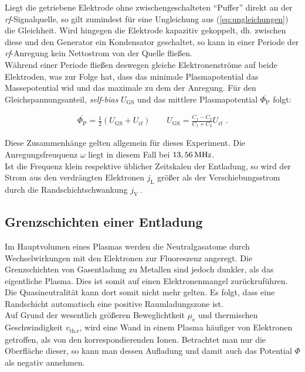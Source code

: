 \documentclass[numbers=noenddot,a4paper]{scrartcl}
\newcommand{\ix}[1]{_\text{#1}}
\newcommand{\tilt}[1]{\textit{#1}}
\begin{document}
			Liegt die getriebene Elektrode ohne zwischengeschalteten ``Puffer'' direkt an der \tilt{rf}-Signalquelle, so gilt zumindest f\"ur eine Ungleichung aus (\ref{eq:ungleichungen}) die Gleichheit. Wird hingegen die Elektrode kapazitiv gekoppelt, dh. zwischen diese und den Generator ein Kondensator geschaltet, so kann in einer Periode der \tilt{rf}-Anregung kein Nettostrom von der Quelle flie{\ss}en.\\
			W\"ahrend einer Periode flie{\ss}en deswegen gleiche Elektronenstr\"ome auf beide Elektroden, was zur Folge hat, dass das minimale Plasmapotential das Massepotential wid und das maximale zu dem der Anregung. F\"ur den Gleichspannungsanteil, \tilt{self-bias} $U\ix{GS}$ und das mittlere Plasmapotential $\overline{\Phi\ix{P}}$ folgt:
			
				\begin{align}
					\overline{\Phi\ix{P}}=\frac{1}{2}\left(U\ix{GS}+U\ix{rf}\right) \quad \quad U\ix{GS}=\frac{C\ix{1}-C\ix{2}}{C\ix{1}+C\ix{2}}U\ix{rf} \,\, .\label{eq:selfbiaszwei} 
				\end{align}
				
			Diese Zusammenh\"ange gelten allgemein f\"ur dieses Experiment. Die Anregungsfreuquenz $\omega$ liegt in diesem Fall bei $\unit[13,56]{MHz}$.\\
			Ist die Frequenz klein respektive \"ublicher Zeitskalen der Entladung, so wird der Strom aus den verdr\"angten Elektronen $j\ix{L}$ gr\"o{\ss}er als der Verschiebungsstrom durch die Randschichtschwankung $j\ix{V}\,$. 
			
		\subsection{Grenzschichten einer Entladung}\label{sub:rand}
		
			Im Hauptvolumen eines Plasmas werden die Neutralgasatome durch Wechselwirkungen mit den Elektronen zur Fluoreszenz angeregt. Die Grenzschichten von Gasentladung zu Metallen sind jedoch dunkler, als das eigentliche Plasma. Dies ist somit auf einen Elektronenmangel zur\"uckruf\"uhren. Die Quasineutralit\"at kann dort somit nicht mehr gelten. Es folgt, dass eine Randschicht automatisch eine positive Raumladungszone ist. \\
			Auf Grund der wesentlich gr\"o{\ss}eren Beweglichtkeit $\mu\ix{e}$ und thermischen Geschwindigkeit $v\ix{th,e}$, wird eine Wand in einem Plasma h\"aufiger von Elektronen getroffen, als von den korrespondierenden Ionen. Betrachtet man nur die Oberfl\"ache dieser, so kann man dessen Aufladung und damit auch das Potential $\Phi$ als negativ annehmen.
\end{document}
